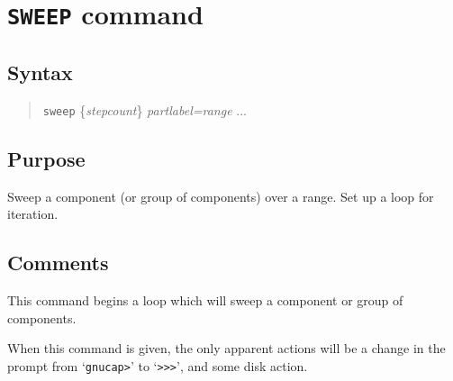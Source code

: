 %
%
%
%
\section{{\tt SWEEP} command}
\subsection{Syntax}
\begin{verse}
{\tt sweep} \{{\it stepcount}\}  {\it partlabel=range} ...
\end{verse}
\subsection{Purpose}

Sweep a component (or group of components) over a range.  Set up a loop for
iteration.
\subsection{Comments}

This command begins a loop which will sweep a component or group of
components.

When this command is given, the only apparent actions will be a change in the
prompt from `{\tt gnucap>}' to `{\tt >>>}', and some disk action.

